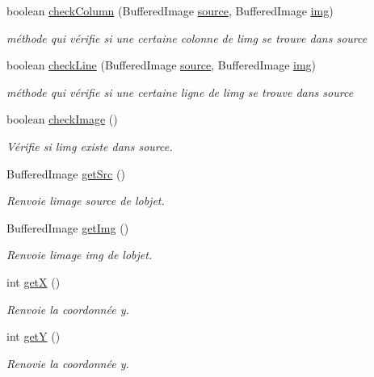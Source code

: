 \begin{DoxyCompactItemize}
boolean \hyperlink{classTestSushi_1_1src_1_1Pictures_1_1FindPicture_a56e9690469fb4e52c0576170379ff1a7}{check\+Column} (Buffered\+Image \hyperlink{classTestSushi_1_1src_1_1Pictures_1_1FindPicture_a8f97c27187060e065669476a0774be89}{source}, Buffered\+Image \hyperlink{classTestSushi_1_1src_1_1Pictures_1_1FindPicture_a2efdf9b4cf94ca02ddc955f9a205c090}{img})
\begin{DoxyCompactList}\small\item\em méthode qui vérifie si une certaine colonne de l\textquotesingle{}img se trouve dans source \end{DoxyCompactList}\item 
boolean \hyperlink{classTestSushi_1_1src_1_1Pictures_1_1FindPicture_adf02994bcf4a6a517aaf543714c746a3}{check\+Line} (Buffered\+Image \hyperlink{classTestSushi_1_1src_1_1Pictures_1_1FindPicture_a8f97c27187060e065669476a0774be89}{source}, Buffered\+Image \hyperlink{classTestSushi_1_1src_1_1Pictures_1_1FindPicture_a2efdf9b4cf94ca02ddc955f9a205c090}{img})
\begin{DoxyCompactList}\small\item\em méthode qui vérifie si une certaine ligne de l\textquotesingle{}img se trouve dans source \end{DoxyCompactList}\item 
boolean \hyperlink{classTestSushi_1_1src_1_1Pictures_1_1FindPicture_ab474926b25aa877731dd0476b99dd42a}{check\+Image} ()
\begin{DoxyCompactList}\small\item\em Vérifie si l\textquotesingle{}img existe dans source. \end{DoxyCompactList}\item 
Buffered\+Image \hyperlink{classTestSushi_1_1src_1_1Pictures_1_1FindPicture_adc71f6e660e967e95f429cee5f27fa55}{get\+Src} ()
\begin{DoxyCompactList}\small\item\em Renvoie l\textquotesingle{}image source de l\textquotesingle{}objet. \end{DoxyCompactList}\item 
Buffered\+Image \hyperlink{classTestSushi_1_1src_1_1Pictures_1_1FindPicture_a8d91848dc7a2eaea672ae3ee3a0caa56}{get\+Img} ()
\begin{DoxyCompactList}\small\item\em Renvoie l\textquotesingle{}image img de l\textquotesingle{}objet. \end{DoxyCompactList}\item 
int \hyperlink{classTestSushi_1_1src_1_1Pictures_1_1FindPicture_aeaee91c49573639fb996740f9536b383}{get\+X} ()
\begin{DoxyCompactList}\small\item\em Renvoie la coordonnée y. \end{DoxyCompactList}\item 
int \hyperlink{classTestSushi_1_1src_1_1Pictures_1_1FindPicture_a9b3afe70eaccc3ba4151d8b3926fb27c}{get\+Y} ()
\begin{DoxyCompactList}\small\item\em Renovie la coordonnée y. \end{DoxyCompactList}\end{DoxyCompactItemize}
